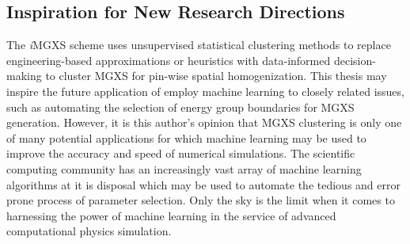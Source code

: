 \subsection{Inspiration for New Research Directions}
\label{subsec:chap12-inspiration}

The \textit{i}\ac{MGXS} scheme uses unsupervised statistical clustering methods to replace engineering-based approximations or heuristics with data-informed decision-making to cluster \ac{MGXS} for pin-wise spatial homogenization. This thesis may inspire the future application of employ machine learning to closely related issues, such as automating the selection of energy group boundaries for \ac{MGXS} generation. However, it is this author's opinion that \ac{MGXS} clustering is only one of many potential applications for which machine learning may be used to improve the accuracy and speed of numerical simulations. The scientific computing community has an increasingly vast array of machine learning algorithms at it is disposal which may be used to automate the tedious and error prone process of parameter selection. Only the sky is the limit when it comes to harnessing the power of machine learning in the service of advanced computational physics simulation.

